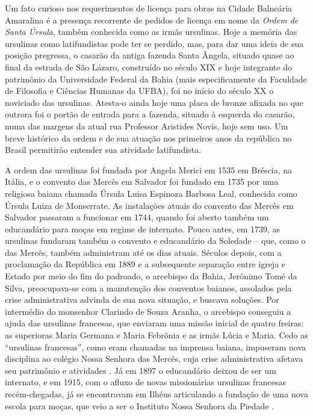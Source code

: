 
Um fato curioso nos requerimentos de licença para obras na Cidade Balneária Amaralina é a presença recorrente de pedidos de licença em nome da \textit{Ordem de Santa Úrsula}, também conhecida como as irmãs ursulinas. Hoje a memória das ursulinas como latifundistas pode ter se perdido, mas, para dar uma ideia de sua posição pregressa, o casarão da antiga fazenda Santa Ângela, situado quase ao final da estrada de São Lázaro, construído no século XIX e hoje integrante do patrimônio da Universidade Federal da Bahia (mais especificamente da Faculdade de Filosofia e Ciências Humanas da UFBA), foi no início do século XX o noviciado das ursulinas. Atesta-o ainda hoje uma placa de bronze afixada no que outrora foi o portão de entrada para a fazenda, situado à esquerda do casarão, numa das margens da atual rua Professor Aristides Novis, hoje sem uso. Um breve histórico da ordem e de sua atuação nos primeiros anos da república no Brasil permitirão entender sua atividade latifundista.

A ordem das ursulinas foi fundada por Angela Merici em 1535 em Bréscia, na Itália, e o convento das Mercês em Salvador foi fundado em 1735 por uma religiosa baiana chamada Úrsula Luisa Espinoza Barbosa Leal, conhecida como Úrsula Luiza de Monserrate. As instalações atuais do convento das Mercês em Salvador passaram a funcionar em 1744, quando foi aberto também um educandário para moças em regime de internato. Pouco antes, em 1739, as ursulinas fundaram também o convento e educandário da Soledade -- que, como o das Mercês, também administram até os dias atuais. Séculos depois, com a proclamação da República em 1889 e a subsequente separação entre igreja e Estado por meio do fim do padroado, o arcebispo da Bahia, Jerônimo Tomé da Silva, preocupava-se com a manutenção dos conventos baianos, assolados pela crise administrativa advinda de sua nova situação, e buscava soluções. Por intermédio do monsenhor Clarindo de Souza Aranha, o arcebispo conseguiu a ajuda das ursulinas francesas, que enviaram uma missão inicial de quatro freiras: as superioras Maria Germana e Maria Febrônia e as irmãs Lúcia e Maria. Cedo as ``ursulinas francesas'', como eram chamadas na imprensa baiana, impuseram nova disciplina ao colégio Nossa Senhora das Mercês, cuja crise administrativa afetava seu patrimônio e atividades \cite[p.~224]{menezes_modernizacao_2002}. Já em 1897 o educandário deixou de ser um internato, e em 1915, com o afluxo de novas missionárias ursulinas francesas recém-chegadas, já se encontravam em Ilhéus articulando a fundação de uma nova escola para moças, que veio a ser o Instituto Nossa Senhora da Piedade \cite{barbosa_ursulinas_2016}.

